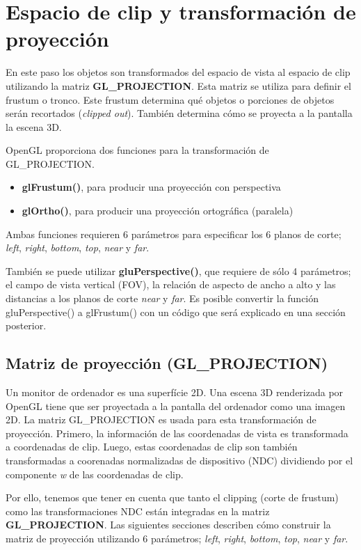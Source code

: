 \chapter{Espacio de clip y transformación de proyección}
En este paso los objetos son transformados del espacio de vista al espacio de clip utilizando la matriz \textbf{GL\_PROJECTION}. Esta matriz se utiliza para definir el frustum o tronco. Este frustum determina qué objetos o porciones de objetos serán recortados (\textit{clipped out}). También determina cómo se proyecta a la pantalla la escena 3D.

OpenGL proporciona dos funciones para la transformación de GL\_PROJECTION.

\begin{itemize}
\item{\textbf{glFrustum()}, para producir una proyección con perspectiva}
\item{\textbf{glOrtho()}, para producir una proyección ortográfica (paralela)}
\end{itemize}

Ambas funciones requieren 6 parámetros para especificar los 6 planos de corte; \textit{left}, \textit{right}, \textit{bottom}, \textit{top}, \textit{near} y \textit{far}.


También se puede utilizar \textbf{gluPerspective()}, que requiere de sólo 4 parámetros; el campo de vista vertical (FOV), la relación de aspecto de ancho a alto y las distancias a los planos de corte \textit{near} y \textit{far}. Es posible convertir la función gluPerspective() a glFrustum() con un código que será explicado en una sección posterior.

\section{Matriz de proyección (GL\_PROJECTION)}
Un monitor de ordenador es una superfície 2D. Una escena 3D renderizada por OpenGL tiene que ser proyectada a la pantalla del ordenador como una imagen 2D. La matriz GL\_PROJECTION es usada para esta transformación de proyección. Primero, la información de las coordenadas de vista es transformada a coordenadas de clip. Luego, estas coordenadas de clip son también transformadas a coorenadas normalizadas de dispositivo (NDC) dividiendo por el componente \textit{w} de las coordenadas de clip.

Por ello, tenemos que tener en cuenta que tanto el clipping (corte de frustum) como las transformaciones NDC están integradas en la matriz \textbf{GL\_PROJECTION}. Las siguientes secciones describen cómo construir la matriz de proyección utilizando 6 parámetros; \textit{left}, \textit{right}, \textit{bottom}, \textit{top}, \textit{near} y \textit{far}.

